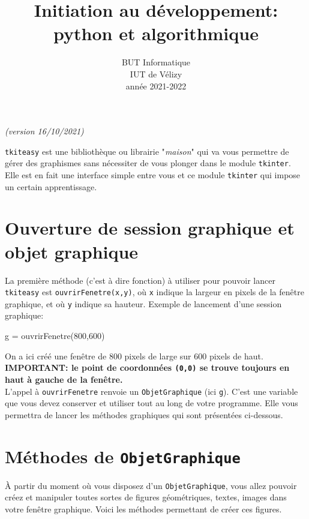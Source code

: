 \documentclass[11pt,a4paper]{article}
\title{Initiation au développement: python et algorithmique}
\author{BUT Informatique\\
IUT de Vélizy\\
année 2021-2022}
\date{}
\begin{document}





\thispagestyle{empty}


\newpage 
\hfill {\it (version 16/10/2021)}
\begin{center}
\end{center}

{\tt tkiteasy} est une bibliothèque ou librairie "{\it maison}" qui va vous permettre de gérer des graphismes sans nécessiter de vous plonger dans le module {\tt tkinter}. Elle est en fait une interface simple entre vous et ce module {\tt tkinter} qui impose un certain apprentissage.

\section{Ouverture de session graphique et objet graphique}
La première méthode (c'est à dire fonction) à utiliser pour pouvoir lancer {\tt tkiteasy} est {\tt ouvrirFenetre(x,y)}, où {\tt x} indique la largeur en pixels de la fenêtre graphique, et où {\tt y} indique sa hauteur. Exemple de lancement d'une session graphique:
\begin{ccode}
    g = ouvrirFenetre(800,600)
\end{ccode}
On a ici créé une fenêtre de 800 pixels de large sur 600 pixels de haut.\\
{\bf IMPORTANT: le point de coordonnées {\tt (0,0)} se trouve toujours en haut à gauche de la fenêtre.}\\

L'appel à {\tt ouvrirFenetre} renvoie un {\tt ObjetGraphique} (ici {\tt g}). C'est une variable que vous devez conserver et utiliser tout au long de votre programme. Elle vous permettra de lancer les méthodes graphiques qui sont présentées ci-dessous.

\section{Méthodes de {\tt ObjetGraphique}}
\`A partir du moment où vous disposez d'un {\tt ObjetGraphique}, vous allez pouvoir créez et manipuler toutes sortes de figures géométriques, textes, images dans votre fenêtre graphique. Voici les méthodes permettant de créer ces figures.
\end{document}
